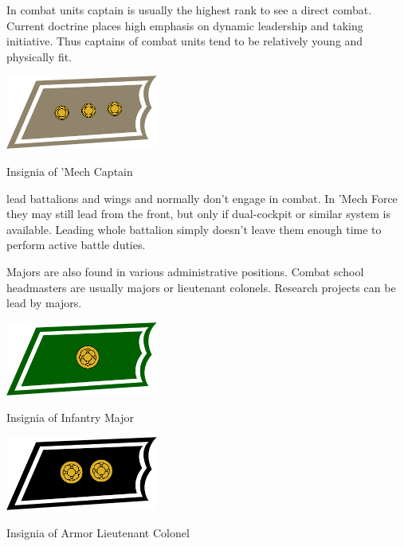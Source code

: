 \documentclass{tufte-book}
\begin{document}
In combat units captain is usually the highest rank to see a direct combat.
Current doctrine places high emphasis on dynamic leadership and taking
initiative. Thus captains of combat units tend to be relatively young and
physically fit.

\begin{marginfigure}[0\baselineskip]
  \includegraphics[width=5.0cm]{rank-captain}
  \caption{Insignia of 'Mech Captain}
  \label{fig:insignia_captain}
\end{marginfigure}

 lead battalions and wings and normally don't engage in
combat. In 'Mech Force they may still lead from the front, but only if
dual-cockpit or similar system is available. Leading whole battalion simply
doesn't leave them enough time to perform active battle duties.

Majors are also found in various administrative positions. Combat school
headmasters are usually majors or lieutenant colonels. Research projects
can be lead by majors.

\begin{marginfigure}[0\baselineskip]
  \includegraphics[width=5.0cm]{rank-major}
  \caption{Insignia of Infantry Major}
  \label{fig:insignia_major}
\end{marginfigure}


\begin{marginfigure}[0\baselineskip]
  \includegraphics[width=5.0cm]{rank-lieutenant-colonel}
  \caption{Insignia of Armor Lieutenant Colonel}
  \label{fig:insignia_lieutenant_colonel}
\end{marginfigure}
\end{document}
